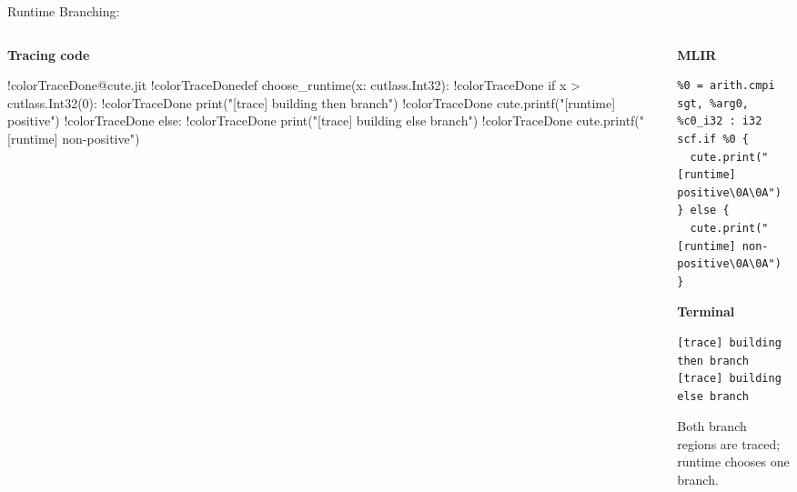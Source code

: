 \documentclass[aspectratio=169,11pt]{beamer}
\newcommand{\code}[1]{\texttt{\detokenize{#1}}}
\begin{document}
\begin{frame}[fragile]{Runtime Branching: \code{if x > 0}}
\begin{columns}[T,totalwidth=\textwidth]
  \begin{column}{0.48\textwidth}
    \small\textbf{Tracing code}
\begin{TraceCode}
!color{TraceDone}@cute.jit
!color{TraceDone}def choose_runtime(x: cutlass.Int32):
!color{TraceDone}    if x > cutlass.Int32(0):
!color{TraceDone}        print("[trace] building then branch")
!color{TraceDone}        cute.printf("[runtime] positive\n")
!color{TraceDone}    else:
!color{TraceDone}        print("[trace] building else branch")
!color{TraceDone}        cute.printf("[runtime] non-positive\n")
\end{TraceCode}
  \end{column}
  \begin{column}{0.52\textwidth}
    \small\textbf{MLIR}
\begin{lstlisting}[style=traceir]
%c0_i32 = arith.constant 0 : i32
%0 = arith.cmpi sgt, %arg0, %c0_i32 : i32
scf.if %0 {
  cute.print("[runtime] positive\0A\0A")
} else {
  cute.print("[runtime] non-positive\0A\0A")
}
\end{lstlisting}

    \vspace{0.45em}
    \small\textbf{Terminal}
\begin{lstlisting}[style=terminal]
[trace] building then branch
[trace] building else branch
\end{lstlisting}

    \vspace{0.25em}
    \footnotesize\color{TraceNote}
    Both branch regions are traced; runtime chooses one branch.
  \end{column}
\end{columns}
\end{frame}
\end{document}
